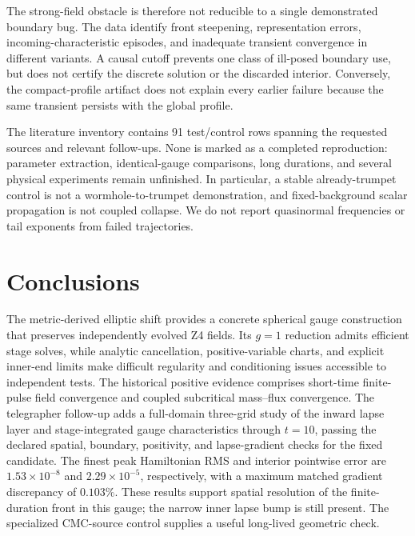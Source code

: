 The strong-field obstacle is therefore not reducible to a single demonstrated boundary bug. The data identify front steepening, representation errors, incoming-characteristic episodes, and inadequate transient convergence in different variants. A causal cutoff prevents one class of ill-posed boundary use, but does not certify the discrete solution or the discarded interior. Conversely, the compact-profile artifact does not explain every earlier failure because the same transient persists with the global profile.

The literature inventory contains 91 test/control rows spanning the requested sources and relevant follow-ups. None is marked as a completed reproduction: parameter extraction, identical-gauge comparisons, long durations, and several physical experiments remain unfinished. In particular, a stable already-trumpet control is not a wormhole-to-trumpet demonstration, and fixed-background scalar propagation is not coupled collapse. We do not report quasinormal frequencies or tail exponents from failed trajectories.

\section{Conclusions}
The metric-derived elliptic shift provides a concrete spherical gauge construction that preserves independently evolved Z4 fields. Its $g=1$ reduction admits efficient stage solves, while analytic cancellation, positive-variable charts, and explicit inner-end limits make difficult regularity and conditioning issues accessible to independent tests. The historical positive evidence comprises short-time finite-pulse field convergence and coupled subcritical mass--flux convergence. The telegrapher follow-up adds a full-domain three-grid study of the inward lapse layer and stage-integrated gauge characteristics through $t=10$, passing the declared spatial, boundary, positivity, and lapse-gradient checks for the fixed candidate. The finest peak Hamiltonian RMS and interior pointwise error are $1.53\times10^{-8}$ and $2.29\times10^{-5}$, respectively, with a maximum matched gradient discrepancy of $0.103\%$. These results support spatial resolution of the finite-duration front in this gauge; the narrow inner lapse bump is still present. The specialized CMC-source control supplies a useful long-lived geometric check.

